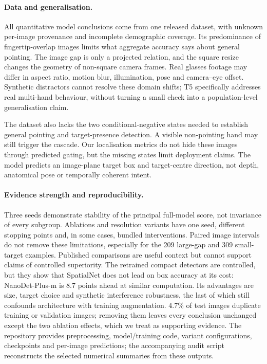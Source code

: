 \paragraph{Data and generalisation.}
All quantitative model conclusions come from one released dataset, with unknown per-image provenance and incomplete demographic coverage. Its predominance of fingertip-overlap images limits what aggregate accuracy says about general pointing. The image gap is only a projected relation, and the square resize changes the geometry of non-square camera frames. Real glasses footage may differ in aspect ratio, motion blur, illumination, pose and camera--eye offset. Synthetic distractors cannot resolve these domain shifts; T5 specifically addresses real multi-hand behaviour, without turning a small check into a population-level generalisation claim.

The dataset also lacks the two conditional-negative states needed to establish general pointing and target-presence detection. A visible non-pointing hand may still trigger the cascade. Our localisation metrics do not hide these images through predicted gating, but the missing states limit deployment claims. The model predicts an image-plane target box and target-centre direction, not depth, anatomical pose or temporally coherent intent.

\paragraph{Evidence strength and reproducibility.}
Three seeds demonstrate stability of the principal full-model score, not invariance of every subgroup. Ablations and resolution variants have one seed, different stopping points and, in some cases, bundled interventions. Paired image intervals do not remove these limitations, especially for the 209 large-gap and 309 small-target examples. Published comparisons are useful context but cannot support claims of controlled superiority. The retrained compact detectors are controlled, but they show that SpatialNet does not lead on box accuracy at its cost: NanoDet-Plus-m is 8.7 points ahead at similar computation. Its advantages are size, target choice and synthetic interference robustness, the last of which still confounds architecture with training augmentation. 4.7\% of test images duplicate training or validation images; removing them leaves every conclusion unchanged except the two  ablation effects, which we treat as supporting evidence. The repository provides preprocessing, model/training code, variant configurations, checkpoints and per-image predictions; the accompanying audit script reconstructs the selected numerical summaries from these outputs.

